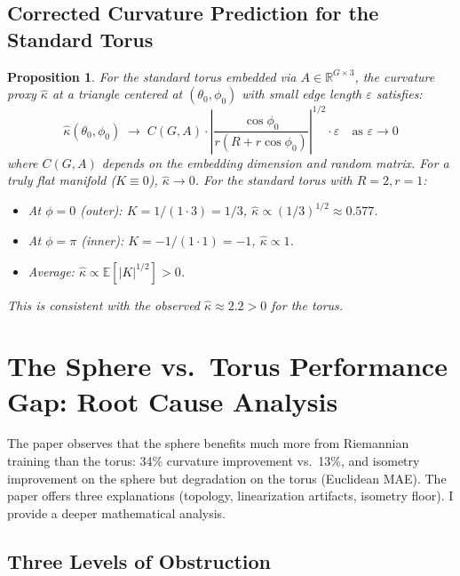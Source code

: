 \documentclass{article}
\newtheorem{proposition}{Proposition}
\begin{document}
\subsection{Corrected Curvature Prediction for the Standard Torus}
\label{sec:bridge_torus_curvature}

\begin{proofbox}
\begin{proposition}
For the standard torus embedded via $A \in \mathbb{R}^{G \times 3}$, the
curvature proxy $\hat{\kappa}$ at a triangle centered at $(\theta_0, \phi_0)$
with small edge length $\varepsilon$ satisfies:
\[
  \hat{\kappa}(\theta_0, \phi_0) \;\to\;
  C(G, A) \cdot \left|\frac{\cos\phi_0}{r(R + r\cos\phi_0)}\right|^{1/2}
  \cdot \varepsilon
  \quad \text{as } \varepsilon \to 0
\]
where $C(G, A)$ depends on the embedding dimension and random matrix.
For a truly flat manifold ($K \equiv 0$), $\hat{\kappa} \to 0$.
For the standard torus with $R = 2, r = 1$:
\begin{itemize}
  \item At $\phi = 0$ (outer): $K = 1/(1 \cdot 3) = 1/3$,
    $\hat{\kappa} \propto (1/3)^{1/2} \approx 0.577$.
  \item At $\phi = \pi$ (inner): $K = -1/(1 \cdot 1) = -1$,
    $\hat{\kappa} \propto 1$.
  \item Average: $\hat{\kappa} \propto \mathbb{E}[|K|^{1/2}] > 0$.
\end{itemize}
This is consistent with the observed $\hat{\kappa} \approx 2.2 > 0$ for the torus.
\end{proposition}
\end{proofbox}

\section{The Sphere vs.\ Torus Performance Gap: Root Cause Analysis}
\label{sec:sphere_vs_torus}

The paper observes that the sphere benefits much more from Riemannian training
than the torus: 34\% curvature improvement vs.\ 13\%, and isometry improvement
on the sphere but degradation on the torus (Euclidean MAE). The paper offers
three explanations (topology, linearization artifacts, isometry floor).
I provide a deeper mathematical analysis.

\subsection{Three Levels of Obstruction}
\end{document}
